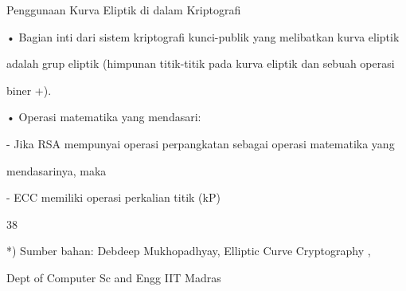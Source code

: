 \documentclass{article}
\begin{document}

Penggunaan Kurva Eliptik di dalam Kriptografi

• Bagian inti dari sistem kriptografi kunci-publik yang melibatkan kurva eliptik 

adalah grup eliptik (himpunan titik-titik pada kurva eliptik dan sebuah operasi 

biner +).

• Operasi matematika yang mendasari:

     -  Jika RSA mempunyai operasi perpangkatan sebagai operasi matematika yang 

mendasarinya, maka

     -  ECC memiliki operasi perkalian titik (kP) 

38

*) Sumber bahan: Debdeep Mukhopadhyay, Elliptic Curve Cryptography ,

 Dept of Computer Sc and Engg IIT Madras
\end{document}
